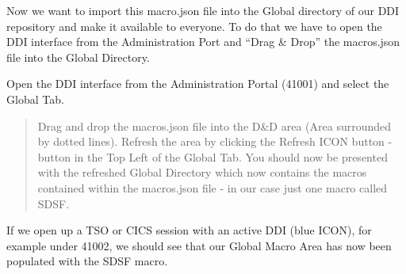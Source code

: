 \documentclass[letterpaper,10pt,english]{sphinxmanual}
\begin{document}
\begin{sphinxVerbatim}[commandchars=\\\{\}]
\PYG{p}{[}\PYG{p}{[}\PYG{p}{]}\PYG{p}{]}
\end{sphinxVerbatim}

Now we want to import this macro.json file into the Global directory of our DDI repository and make it available to everyone. To do that we have to open the DDI interface from the Administration Port and “Drag \& Drop” the macros.json file into the Global Directory.

Open the DDI interface from the Administration Portal (41001) and select the Global Tab.

\begin{quote}

Drag and drop the macros.json file into the D\&D area (Area surrounded by dotted lines). Refresh the area by clicking the Refresh ICON button - button in the Top Left of the Global Tab. You should now be presented with the refreshed Global Directory which now contains the macros contained within the macros.json file - in our case just one macro called SDSF.
\end{quote}


If we open up a TSO or CICS session with an active DDI (blue ICON), for example under 41002, we should see that our Global Macro Area has now been populated with the SDSF macro.
\end{document}
